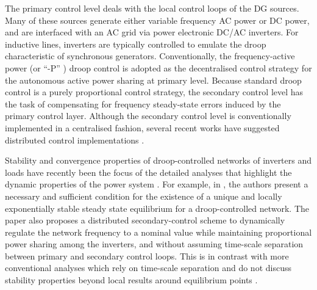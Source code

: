 \documentclass[letter, 10pt, conference]{ieeeconf}
\newcommand{\1}{\mathbf{1}}
\newcommand{\0}{\mathbf{0}}
\begin{document}
The primary control level deals with the local control loops of the DG
sources.  Many of these sources generate either variable frequency AC
power or DC power, and are interfaced with an AC grid via power
electronic DC/AC inverters.  For inductive lines, inverters are
typically controlled to emulate the droop characteristic of
synchronous generators.  Conventionally, the frequency-active power
(or ``-P'' ) droop control \cite{CDA93} is adopted as the
decentralised control strategy for the autonomous active power sharing
at primary level.  Because standard droop control is a purely
proportional control strategy, the secondary control level has the
task of compensating for frequency steady-state errors induced by the
primary control layer.  Although the secondary control level is
conventionally implemented in a centralised fashion, several recent
works have suggested distributed control implementations
\cite{SVG12,ASDJ12,SATS12}.

Stability and convergence properties of droop-controlled networks of
inverters and loads have recently been the focus of the detailed
analyses that highlight the dynamic properties of the power system
\cite{AiG13,ASDJ12,JWSP-FD-FB:12u}.
For example, in \cite{JWSP-FD-FB:12u}, the authors present a necessary 
and sufficient condition for the existence of a unique and locally
exponentially stable steady state equilibrium for a droop-controlled
network.  The paper also proposes a distributed secondary-control
scheme to dynamically regulate the network frequency to a nominal
value while maintaining proportional power sharing among the
inverters, and without assuming time-scale separation between primary
and secondary control loops.  This is in contrast with more
conventional analyses which rely on time-scale separation and do not
discuss stability properties beyond local results around equilibrium
points \cite{JWSP-FD-FB:12u}.
\end{document}
